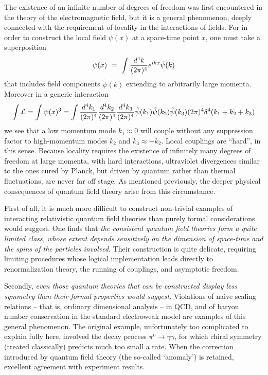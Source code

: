 \documentclass[aps,epsf]{revtex4}
\begin{document}
The existence of an
infinite number of degrees of freedom was first encountered in the
theory of the electromagnetic field, but it is a general phenomenon,
deeply connected with the requirement of locality in the interactions
of fields.  For in order to construct the local field $\psi (x)$ at a
space-time point $x$, one must take a superposition
\begin{equation}
\psi(x) ~=~ \int {d^4k\over (2\pi )^4} e^{ikx} \tilde
\psi (k)
\end{equation}
that includes field components $\tilde \psi (k)$
extending to arbitrarily large momenta.  Moreover in a generic
interaction
\begin{equation}
\int {\cal L} = \int \psi (x)^3 = \int
{d^4k_1\over (2\pi )^4}{d^4k_2\over (2\pi )^4}{d^4k_3 \over (2\pi )^4}
\tilde \psi (k_1) \tilde \psi (k_2) \tilde \psi (k_3) (2\pi
)^4\delta^4(k_1 + k_2 +k_3)
\end{equation}
we see that a low momentum
mode $k_1 \approx 0 $ will couple without any suppression factor to
high-momentum modes $k_2$ and $k_3 \approx -k_2$.  Local couplings are
``hard'', in this sense. Because locality requires the existence
of infinitely many degrees of freedom at large momenta, with hard
interactions, ultraviolet divergences similar to the ones cured by
Planck, but driven by quantum rather than thermal fluctuations, are
never far off stage.  As mentioned previously, the deeper physical
consequences of quantum field theory arise from this circumstance.


First of all, it is much more difficult to construct non-trivial
examples of interacting relativistic quantum field theories than
purely formal considerations would suggest.  One finds that {\it the
consistent quantum field theories form a quite limited class, whose
extent depends sensitively on the dimension of space-time and the
spins of the particles involved}.  Their construction is quite
delicate, requiring limiting procedures whose logical implementation
leads directly to renormalization theory, the running of couplings,
and asymptotic freedom.  

Secondly, {\it even those quantum theories
that can be constructed display less symmetry than their formal
properties would suggest}.  Violations of naive scaling relations --
that is, ordinary dimensional analysis -- in QCD, and of baryon number
conservation in the standard electroweak model are examples of this
general phenomenon.  The original example, unfortunately too
complicated to explain fully here, involved the decay process $\pi^o
\rightarrow \gamma \gamma$, for which chiral symmetry (treated
classically) predicts much too small a rate.  When the correction
introduced by quantum field theory (the so-called `anomaly') is
retained, excellent agreement with experiment results.   
\end{document}
